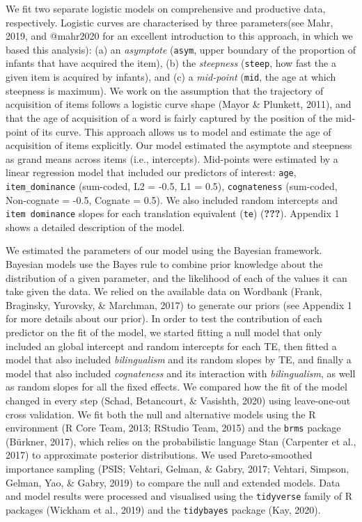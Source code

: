 \documentclass[
  english,
  man,man,floatsintext]{apa6}
\begin{document}
We fit two separate logistic models on comprehensive and productive data, respectively. Logistic curves are characterised by three parameters(see Mahr, 2019, and @mahr2020 for an excellent introduction to this approach, in which we based this analysis): (a) an \emph{asymptote} (\texttt{asym}, upper boundary of the proportion of infants that have acquired the item), (b) the \emph{steepness} (\texttt{steep}, how fast the a given item is acquired by infants), and (c) a \emph{mid-point} (\texttt{mid}, the age at which steepness is maximum). We work on the assumption that the trajectory of acquisition of items follows a logistic curve shape (Mayor \& Plunkett, 2011), and that the age of acquisition of a word is fairly captured by the position of the mid-point of its curve. This approach allows us to model and estimate the age of acquisition of items explicitly. Our model estimated the asymptote and steepness as grand means across items (i.e., intercepts). Mid-points were estimated by a linear regression model that included our predictors of interest: \texttt{age}, \texttt{item\_dominance} (sum-coded, L2 = -0.5, L1 = 0.5), \texttt{cognateness} (sum-coded, Non-cognate = -0.5, Cognate = 0.5). We also included random intercepts and \texttt{item\ dominance} slopes for each translation equivalent (\texttt{te}) ({\textbf{???}}). Appendix 1 shows a detailed description of the model.

We estimated the parameters of our model using the Bayesian framework. Bayesian models use the Bayes rule to combine prior knowledge about the distribution of a given parameter, and the likelihood of each of the values it can take given the data. We relied on the available data on Wordbank (Frank, Braginsky, Yurovsky, \& Marchman, 2017) to generate our priors (see Appendix 1 for more details about our prior). In order to test the contribution of each predictor on the fit of the model, we started fitting a null model that only included an global intercept and random intercepts for each TE, then fitted a model that also included \emph{bilingualism} and its random slopes by TE, and finally a model that also included \emph{cognateness} and its interaction with \emph{bilingualism}, as well as random slopes for all the fixed effects. We compared how the fit of the model changed in every step (Schad, Betancourt, \& Vasishth, 2020) using leave-one-out cross validation. We fit both the null and alternative models using the R environment (R Core Team, 2013; RStudio Team, 2015) and the \texttt{brms} package (Bürkner, 2017), which relies on the probabilistic language Stan (Carpenter et al., 2017) to approximate posterior distributions. We used Pareto-smoothed importance sampling (PSIS; Vehtari, Gelman, \& Gabry, 2017; Vehtari, Simpson, Gelman, Yao, \& Gabry, 2019) to compare the null and extended models. Data and model results were processed and visualised using the \texttt{tidyverse} family of R packages (Wickham et al., 2019) and the \texttt{tidybayes} package (Kay, 2020).
\end{document}
